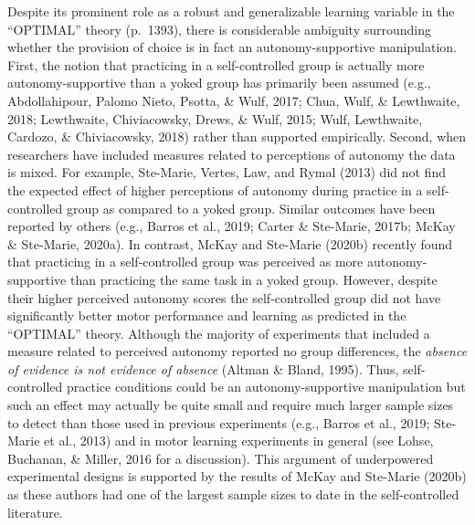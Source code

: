 \documentclass[
  english,
  man, donotrepeattitle,floatsintext]{apa7}
\begin{document}
Despite its prominent role as a robust and generalizable learning variable in the ``OPTIMAL'' theory (p.~1393), there is considerable ambiguity surrounding whether the provision of choice is in fact an autonomy-supportive manipulation. First, the notion that practicing in a self-controlled group is actually more autonomy-supportive than a yoked group has primarily been assumed (e.g., Abdollahipour, Palomo Nieto, Psotta, \& Wulf, 2017; Chua, Wulf, \& Lewthwaite, 2018; Lewthwaite, Chiviacowsky, Drews, \& Wulf, 2015; Wulf, Lewthwaite, Cardozo, \& Chiviacowsky, 2018) rather than supported empirically. Second, when researchers have included measures related to perceptions of autonomy the data is mixed. For example, Ste-Marie, Vertes, Law, and Rymal (2013) did not find the expected effect of higher perceptions of autonomy during practice in a self-controlled group as compared to a yoked group. Similar outcomes have been reported by others (e.g., Barros et al., 2019; Carter \& Ste-Marie, 2017b; McKay \& Ste-Marie, 2020a). In contrast, McKay and Ste-Marie (2020b) recently found that practicing in a self-controlled group was perceived as more autonomy-supportive than practicing the same task in a yoked group. However, despite their higher perceived autonomy scores the self-controlled group did not have significantly better motor performance and learning as predicted in the ``OPTIMAL'' theory. Although the majority of experiments that included a measure related to perceived autonomy reported no group differences, the \emph{absence of evidence is not evidence of absence} (Altman \& Bland, 1995). Thus, self-controlled practice conditions could be an autonomy-supportive manipulation but such an effect may actually be quite small and require much larger sample sizes to detect than those used in previous experiments (e.g., Barros et al., 2019; Ste-Marie et al., 2013) and in motor learning experiments in general (see Lohse, Buchanan, \& Miller, 2016 for a discussion). This argument of underpowered experimental designs is supported by the results of McKay and Ste-Marie (2020b) as these authors had one of the largest sample sizes to date in the self-controlled literature.
\end{document}
